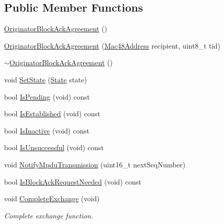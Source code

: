 \subsection*{Public Member Functions}
\begin{DoxyCompactItemize}
\item 
\hyperlink{classns3_1_1OriginatorBlockAckAgreement_a49de6bbd041b4973a54a7c5b3ae8a6dc}{Originator\+Block\+Ack\+Agreement} ()
\item 
\hyperlink{classns3_1_1OriginatorBlockAckAgreement_a88cb9699c2cc936678f4e318d272273a}{Originator\+Block\+Ack\+Agreement} (\hyperlink{classns3_1_1Mac48Address}{Mac48\+Address} recipient, uint8\+\_\+t tid)
\item 
\hyperlink{classns3_1_1OriginatorBlockAckAgreement_a606f07545086c0e30e0b91ec51a76c2d}{$\sim$\+Originator\+Block\+Ack\+Agreement} ()
\item 
void \hyperlink{classns3_1_1OriginatorBlockAckAgreement_a9e4332cfb716770ff96992145cc07f2b}{Set\+State} (\hyperlink{classns3_1_1OriginatorBlockAckAgreement_ab33ae8af8c458aca7437a472778e4761}{State} state)
\item 
bool \hyperlink{classns3_1_1OriginatorBlockAckAgreement_a6fccb4156d6d9de6b2765ea282031dba}{Is\+Pending} (void) const 
\item 
bool \hyperlink{classns3_1_1OriginatorBlockAckAgreement_a5ffe5142d1466e2579555f8ac465fa5e}{Is\+Established} (void) const 
\item 
bool \hyperlink{classns3_1_1OriginatorBlockAckAgreement_a6c7db1d8bf3d87041080ac857c68a195}{Is\+Inactive} (void) const 
\item 
bool \hyperlink{classns3_1_1OriginatorBlockAckAgreement_a2bc99272b5a49f4cc41022c8b6af7862}{Is\+Unsuccessful} (void) const 
\item 
void \hyperlink{classns3_1_1OriginatorBlockAckAgreement_a3c42fb5679238dc8da5ea4d4608b3e53}{Notify\+Mpdu\+Transmission} (uint16\+\_\+t next\+Seq\+Number)
\item 
bool \hyperlink{classns3_1_1OriginatorBlockAckAgreement_a5da6d8a8df97cdb21965f5c4bd0d6f02}{Is\+Block\+Ack\+Request\+Needed} (void) const 
\item 
void \hyperlink{classns3_1_1OriginatorBlockAckAgreement_a09ec20d8bf846f95bc110c87af749a6b}{Complete\+Exchange} (void)
\begin{DoxyCompactList}\small\item\em Complete exchange function. \end{DoxyCompactList}\end{DoxyCompactItemize}
